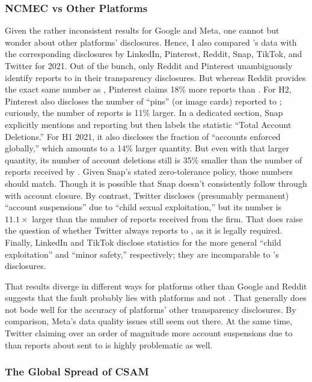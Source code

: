 \subsubsection{NCMEC vs Other Platforms}

Given the rather inconsistent results for Google and Meta, one cannot but wonder
about other platforms' disclosures. Hence, I also compared 's data with
the corresponding disclosures by LinkedIn, Pinterest, Reddit, Snap, TikTok, and
Twitter for 2021. Out of the bunch, only Reddit and Pinterest unambiguously
identify  reports to  in their transparency disclosures. But
whereas Reddit provides the exact same number as , Pinterest claims 18\%
more reports than . For H2, Pinterest also discloses the number of
``pins'' (or image cards) reported to ; curiously, the number of reports
is 11\% larger. In a dedicated section, Snap explicitly mentions  and
 reporting but then labels the statistic ``Total Account Deletions.'' For
H1 2021, it also discloses the fraction of ``accounts enforced globally,'' which
amounts to a 14\% larger quantity. But even with that larger quantity, its
number of account deletions still is 35\% smaller than the number of reports
received by . Given Snap's stated zero-tolerance policy, those numbers
should match. Though it is possible that Snap doesn't consistently follow
through with account closure. By contrast, Twitter discloses (presumably
permanent) ``account suspensions'' due to ``child sexual exploitation,'' but its
number is $11.1\times$ larger than the number of reports 
received from the firm. That does raise the question of whether Twitter always
reports  to , as it is legally required. Finally, LinkedIn and
TikTok disclose statistics for the more general ``child exploitation'' and
``minor safety,'' respectively; they are incomparable to 's disclosures.

That results diverge in different ways for platforms other than Google and
Reddit suggests that the fault probably lies with platforms and not . That
generally does not bode well for the accuracy of platforms' other transparency
disclosures. By comparison, Meta's data quality issues still seem out there. At
the same time, Twitter claiming over an order of magnitude more account
suspensions due to  than reports about  sent to  is highly
problematic as well.


\subsubsection{The Global Spread of CSAM}

